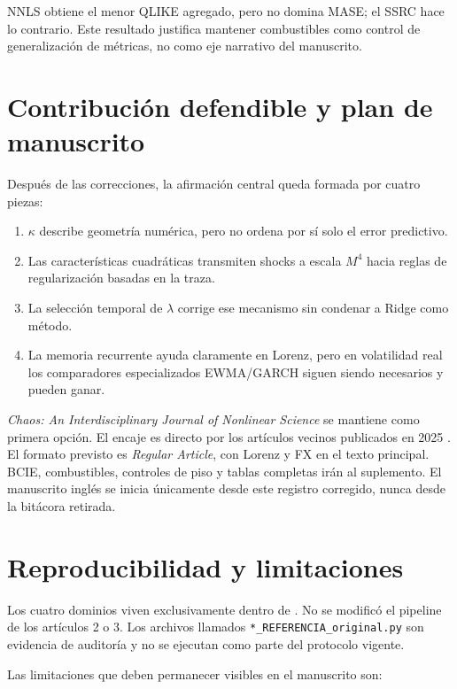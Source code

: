 \documentclass[11pt]{article}
\newcommand{\kap}{\kappa}
\begin{document}
NNLS obtiene el menor QLIKE agregado, pero no domina MASE; el SSRC hace lo contrario. Este
resultado justifica mantener combustibles como control de generalización de métricas, no como
eje narrativo del manuscrito.

\section{Contribución defendible y plan de manuscrito}

Después de las correcciones, la afirmación central queda formada por cuatro piezas:

\begin{enumerate}
\item $\kap$ describe geometría numérica, pero no ordena por sí solo el error predictivo.
\item Las características cuadráticas transmiten shocks a escala $M^4$ hacia reglas de
regularización basadas en la traza.
\item La selección temporal de $\lambda$ corrige ese mecanismo sin condenar a Ridge como
método.
\item La memoria recurrente ayuda claramente en Lorenz, pero en volatilidad real los
comparadores especializados EWMA/GARCH siguen siendo necesarios y pueden ganar.
\end{enumerate}

\emph{Chaos: An Interdisciplinary Journal of Nonlinear Science} se mantiene como primera opción.
El encaje es directo por los artículos vecinos publicados en 2025
\cite{zhang2025moredata,dossantos2025instability}. El formato previsto es \emph{Regular
Article}, con Lorenz y FX en el texto principal. BCIE, combustibles, controles de piso y tablas
completas irán al suplemento. El manuscrito inglés se inicia únicamente desde este registro
corregido, nunca desde la bitácora retirada.

\section{Reproducibilidad y limitaciones}

Los cuatro dominios viven exclusivamente dentro de
. No se modificó el pipeline de los artículos 2 o 3.
Los archivos llamados \texttt{*\_REFERENCIA\_original.py} son evidencia de auditoría y no se
ejecutan como parte del protocolo vigente.

Las limitaciones que deben permanecer visibles en el manuscrito son:
\end{document}
